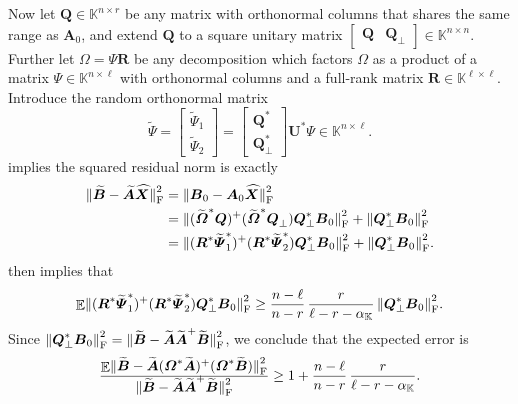 \documentclass[11pt]{article}
\newcommand{\field}{\mathbb{K}}
\newcommand{\mat}[1]{\boldsymbol{#1}}
\newcommand{\norm}[1]{\mleft\| #1 \mright\|}
\newcommand{\twobyone}[2]{%
  \begin{bmatrix}#1 \\ #2\end{bmatrix}}
\DeclareMathOperator{\expect}{\mathbb{E}}
\renewcommand{\tilde}[1]{\widetilde{#1}}
\newcommand{\hatbold}[1]{%
  \skew{4}\widehat{\smash{\boldsymbol{#1}}\mathstrut}}
\newcommand{\Xhat}{\smash{\hatbold{X}}}
\theoremstyle{definition}
\numberwithin{equation}{section}
\begin{document}
Now let $\mat{Q} \in \field^{n \times r}$ be any matrix with orthonormal columns that shares the same range as $\mat{A}_0$, and extend $\mat{Q}$ to a square unitary matrix $[\begin{matrix} \mat{Q} & \mat{Q}_\perp \end{matrix}] \in \field^{n\times n}$.
Further let $\mat{\varOmega} = \mat{\varPsi} \mat{R}$ be any decomposition which factors $\mat{\varOmega}$ as a product of a matrix $\mat{\varPsi} \in \field^{n\times \ell}$ with orthonormal columns and a full-rank matrix $\mat{R} \in \field^{\ell \times \ell}$.
Introduce the random orthonormal matrix
\begin{equation*}
    \tilde{\mat{\varPsi}} = \twobyone{\tilde{\mat{\varPsi}}_1}{\tilde{\mat{\varPsi}}_2}
    = \twobyone{\mat{Q}^*}{\mat{Q}_{\perp}^*} \mat{U}^* \mat{\varPsi} \in \field^{n \times \ell}.
\end{equation*}
 implies the squared residual norm is exactly
\begin{align*}
    \norm{\smash{\mat{\tilde{B}} - \mat{\tilde{A}}\Xhat}}_{\rm F}^2 
    &= \norm{\mat{B}_0 - \mat{A}_0\Xhat}_{\rm F}^2 \\
    &= \norm{\smash{(\tilde{\mat{\varOmega}}^*\mat{Q})^+(\tilde{\mat{\varOmega}}^*\mat{Q}_\perp^{\vphantom{*}}) \mat{Q}_\perp^*\mat{B}_0}}_{\rm F}^2 + \norm{\mat{Q}_\perp^*\mat{B}_0}_{\rm F}^2 \\
    &= \norm{\smash{(\mat{R}^* \tilde{\mat{\varPsi}}_1^*)^+(\mat{R}^* \tilde{\mat{\varPsi}}_2^*) \mat{Q}_\perp^*\mat{B}_0}}_{\rm F}^2 + \norm{\mat{Q}_\perp^*\mat{B}_0}_{\rm F}^2.
\end{align*}
%
 then implies that
\begin{equation*}
    \expect \norm{\smash{(\mat{R}^* \tilde{\mat{\varPsi}}_1^*)^+(\mat{R}^* \tilde{\mat{\varPsi}}_2^*) \mat{Q}_\perp^*\mat{B}_0}}_{\rm F}^2 
    \geq \frac{n-\ell}{n-r} \, \frac{r}{\ell - r - \alpha_\field} \, \norm{\mat{Q}_\perp^*\mat{B}_0}_{\rm F}^2.
\end{equation*}
Since $\norm{\mat{Q}_\perp^*\mat{B}_0}_{\rm F}^2 = \norm{\smash{\tilde{\mat{B}} - \tilde{\mat{A}} \tilde{\mat{A}}^+ \tilde{\mat{B}}}}_{\rm F}^2$, we conclude that the expected error is
\begin{equation*}
    \frac{\expect \norm{\smash{\tilde{\mat{B}} - \tilde{\mat{A}} (\mat{\varOmega}^* \tilde{\mat{A}})^+ (\mat{\varOmega}^* \tilde{\mat{B}})}}_{\rm F}^2}
    {\norm{\smash{\tilde{\mat{B}} - \tilde{\mat{A}} \tilde{\mat{A}}^+ \tilde{\mat{B}}}}_{\rm F}^2}
    \geq 1 + \frac{n-\ell}{n-r} \, \frac{r}{\ell - r - \alpha_\field}.
\end{equation*}
\end{document}
